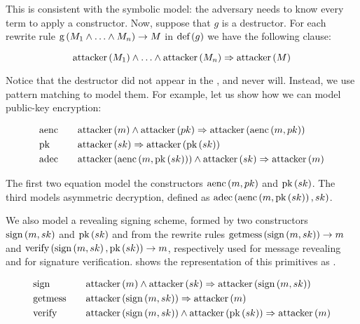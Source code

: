 This is consistent with the symbolic model: the adversary needs to know every term to apply a constructor.
Now, suppose that $g$ is a destructor. For each rewrite rule $\mbox{g}\left(M_1 \land \ldots \land M_n\right) \rightarrow M$ in $\mbox{def}\left(g\right)$ we have the following clause:

\begin{equation}
    \mbox{attacker}\left(M_1\right) \land \ldots \land \mbox{attacker}\left(M_n\right) \Rightarrow \mbox{attacker}\left(M\right)
\end{equation}

Notice that the destructor did not appear in the \Hornc{}, and never will. Instead, we use pattern matching to model them. For example, let us show how we can model public-key encryption:

\begin{equation}
    \begin{alignedat}{3}
        & \mbox{aenc} \qquad && \mbox{attacker}\left(m\right) \land \mbox{attacker}\left(pk\right) \Rightarrow \mbox{attacker}\left(\mbox{aenc}\left(m, pk\right)\right)            \\
        & \mbox{pk} \qquad   && \mbox{attacker}\left(sk\right) \Rightarrow \mbox{attacker}\left(\mbox{pk}\left(sk\right)\right)                                  \\
        & \mbox{adec} \qquad && \mbox{attacker}\left(\mbox{aenc}\left(m, \mbox{pk}\left(sk\right)\right)\right) \land \mbox{attacker}\left(sk\right) \Rightarrow \mbox{attacker}\left(m\right)
    \end{alignedat}
\end{equation}

The first two equation model the constructors $\mbox{aenc}\left(m, pk\right)$ and $\mbox{pk}\left(sk\right)$. The third models asymmetric decryption, defined as $\mbox{adec}\left(\mbox{aenc}\left(m, \mbox{pk}\left(sk\right)\right), sk\right)$.

\sloppy We also model a revealing signing scheme, formed by two constructors $\mbox{sign}\left(m, sk\right)$ and $\mbox{pk}\left(sk\right)$ and from the rewrite rules $\mbox{getmess}\left(\mbox{sign}\left(m, sk\right)\right) \rightarrow m$ and $\mbox{verify}\left(\mbox{sign}\left(m, sk\right), \mbox{pk}\left(sk\right)\right) \rightarrow m$, respectively used for message revealing and for signature verification.  shows the representation of this primitives as \Horncs{}.

\begin{equation}
    \label{eq:signing-horn-clauses}
    \begin{alignedat}{3}
        & \mbox{sign} \qquad    && \mbox{attacker}\left(m\right) \land \mbox{attacker}\left(sk\right) \Rightarrow \mbox{attacker}\left(\mbox{sign}\left(m, sk\right)\right)            \\
        & \mbox{getmess} \qquad && \mbox{attacker}\left(\mbox{sign}\left(m, sk\right)\right) \Rightarrow \mbox{attacker}\left(m\right)                              \\
        & \mbox{verify} \qquad  && \mbox{attacker}\left(\mbox{sign}\left(m, sk\right)\right) \land \mbox{attacker}\left(\mbox{pk}\left(sk\right)\right) \Rightarrow \mbox{attacker}\left(m\right)
    \end{alignedat}
\end{equation}

